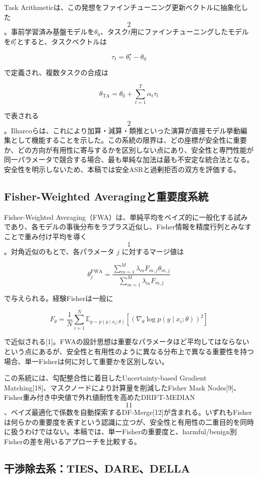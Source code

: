 \documentclass{article}
\begin{document}
Task Arithmeticは、この発想をファインチューニング更新ベクトルに抽象化した\[2\]。事前学習済み基盤モデルを\(\theta_0\)、タスク\(t\)用にファインチューニングしたモデルを\(\theta_t^\star\)とすると、タスクベクトルは

\[
\tau_t=\theta_t^\star-\theta_0
\tag{2}
\]

で定義され、複数タスクの合成は

\[
\theta_{\mathrm{TA}}=\theta_0+\sum_{t=1}^{T}\alpha_t\tau_t
\tag{3}
\]

で表される\[2\]。Ilharcoらは、これにより加算・減算・類推といった演算が直接モデル挙動編集として機能することを示した。この系統の限界は、どの座標が安全性に重要か、どの方向が有用性に寄与するかを区別しない点にあり、安全性と専門性能が同一パラメータで競合する場合、最も単純な加法は最も不安定な統合法となる。安全性を明示しないため、本稿では安全ASRと過剰拒否の双方を評価する。

\subsection{Fisher-Weighted Averagingと重要度系統}

Fisher-Weighted Averaging（FWA）は、単純平均をベイズ的に一般化する試みであり、各モデルの事後分布をラプラス近似し、Fisher情報を精度行列とみなすことで重み付け平均を導く\[1\]。対角近似のもとで、各パラメータ \(j\) に対するマージ値は

\[
\theta_j^{\mathrm{FWA}}=\frac{\sum_{m=1}^{M}\lambda_m F_{m,j}\theta_{m,j}}{\sum_{m=1}^{M}\lambda_m F_{m,j}}
\tag{4}
\]

で与えられる。経験Fisherは一般に

\[
\hat F_{\theta}=\frac{1}{N}\sum_{i=1}^{N}\mathbb{E}_{y\sim p(y\mid x_i;\theta)}\left[(\nabla_{\theta}\log p(y\mid x_i;\theta))^2\right]
\tag{5}
\]

で近似される[1]。FWAの設計思想は重要なパラメータほど平均してはならないという点にあるが、安全性と有用性のように異なる分布上で異なる重要性を持つ場合、単一Fisherは何に対して重要かを区別しない。

この系統には、勾配整合性に着目したUncertainty-based Gradient Matching[18]、マスクノードにより計算量を削減したFisher Mask Nodes[9]、Fisher重み付き中央値で外れ値耐性を高めたDRIFT-MEDIAN\[11\]、ベイズ最適化で係数を自動探索するDF-Merge[12]が含まれる。いずれもFisherは何らかの重要度を表すという認識に立つが、安全性と有用性の二重目的を同時に扱うわけではない。本稿では、単一Fisherの重要度と、harmful/benign別Fisherの差を用いるアプローチを比較する。

\subsection{干渉除去系：TIES、DARE、DELLA}
\end{document}
